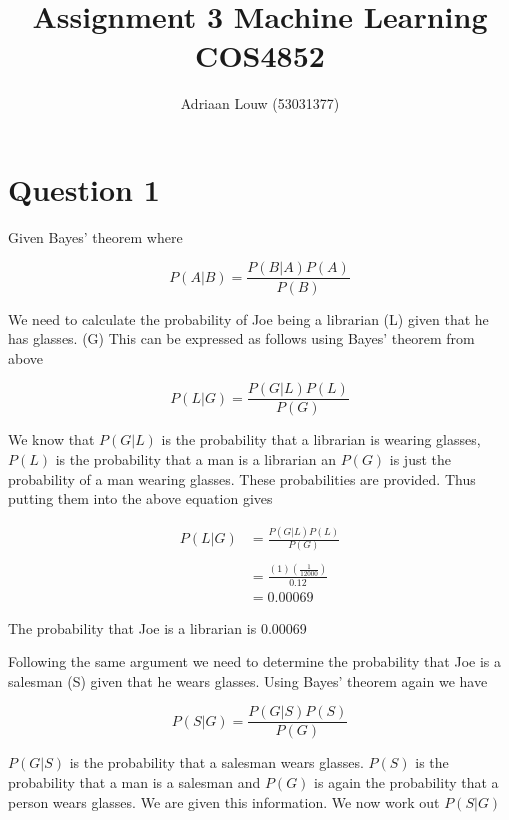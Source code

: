\documentclass[10pt,a4paper]{article}
\title{Assignment 3 Machine Learning COS4852}
\author{ Adriaan Louw (53031377) }
\begin{document}
\maketitle

\tableofcontents

\section{Question 1}
Given Bayes' theorem where

\begin{equation}
P(A|B) = \frac{P(B|A)P(A)}{P(B)}
\end{equation}

We need to calculate the probability of Joe being a librarian (L) given that he has glasses. (G) This can be expressed as follows using Bayes' theorem from above

\begin{equation}
P(L|G) = \frac{P(G|L)P(L)}{P(G)}
\end{equation}

We know that $P(G|L)$ is the probability that a librarian is wearing glasses, $P(L)$ is the probability that a man is a librarian an $P(G)$ is just the probability of a man wearing glasses. These probabilities are provided. Thus putting them into the above equation gives

\begin{equation}
\begin{split}
P(L|G) &= \frac{P(G|L)P(L)}{P(G)}\\\\
       &= \frac{(1)(\frac{1}{12000})}{0.12}\\
       &= 0.00069
\end{split}
\end{equation}

The probability that Joe is a librarian is 0.00069

Following the same argument we need to determine the probability that Joe is a salesman (S) given that 
he wears glasses. Using Bayes' theorem  again we have

\begin{equation}
P(S|G) = \frac{P(G|S)P(S)}{P(G)}
\end{equation}

$P(G|S)$ is the probability that a salesman wears glasses. $P(S)$ is the probability that a man is a salesman and $P(G)$ is again the probability that a person wears glasses. We are given this information. We now work out $P(S|G)$
\end{document}
